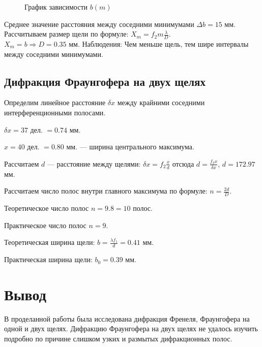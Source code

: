 \documentclass[a4paper, 12pt]{article}
\begin{document}
	\begin{figure}[h]
		\centering
		\caption{График зависимости $b(m)$}
		\label{graph}
	\end{figure}
	Среднее значение расстояния между соседними минимумами $\Delta b = 15$ мм.\\
	Рассчитываем размер щели по формуле: $X_m=f_2m\frac{\lambda}{D}$.\\
	$X_m=b\Rightarrow D=0.35$ мм.
	Наблюдения: Чем меньше щель, тем шире интервалы между соседними минимумами.
	\subsection{Дифракция Фраунгофера на двух щелях}
	Определим линейное расстояние $\delta x$ между крайними соседними интерференционными полосами.\par
	$\delta x = 37$ дел. $ = 0.74$ мм.\par
	$x=40$ дел. $=0.80$ мм. — ширина центрального максимума.\par
	Рассчитаем $d$ — расстояние между щелями: $\delta x=f_2\frac{x}{d}$ отсюда $d=\frac{f_2x}{\delta x}$, $d=172.97$ мм.\par
	Рассчитаем число полос внутри главного максимума по формуле: $n=\frac{2d}{D}$.\par
	Теоретическое число полос $n=9.8=10$ полос.\par
	Практическое число полос $n=9$.\par
	Теоретическая ширина щели: $b=\frac{\lambda f_1}{d}=0.41$ мм.\par
	Практическая ширина щели: $b_0=0.39$ мм.
	\section{Вывод}
	В проделанной работы была исследована дифракция Френеля, Фраунгофера на одной и двух щелях. Дифракцию Фраунгофера на двух щелях не удалось изучить подробно по причине слишком узких и размытых дифракционных полос.
\end{document}
